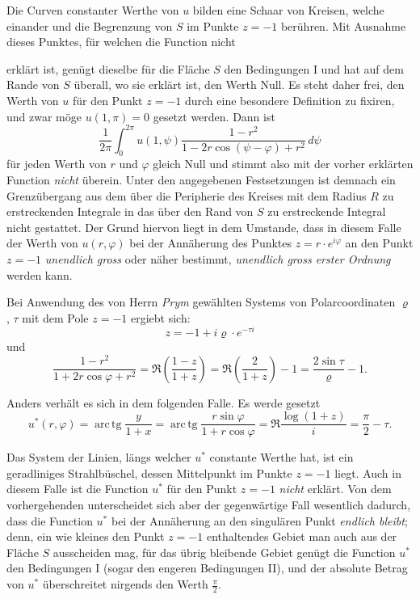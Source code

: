 \documentclass{article}
\begin{document}
Die Curven constanter Werthe von $u$ bilden eine Schaar von Kreisen, welche einander und die Begrenzung von $S$ im Punkte $z = -1$ berühren. Mit Ausnahme dieses Punktes, für welchen die Function nicht

erklärt ist, genügt dieselbe für die Fläche $S$ den Bedingungen I und hat auf dem Rande von $S$ überall, wo sie erklärt ist, den Werth Null. Es steht daher frei, den Werth von $u$ für den Punkt $z = -1$ durch eine besondere Definition zu fixiren, und zwar möge $u(1, \pi) = 0$ gesetzt werden. Dann ist
\[
\frac{1}{2\pi} \int_0^{2\pi} u(1, \psi) \frac{1 - r^2}{1 - 2r \cos(\psi - \varphi) + r^2}\,d\psi
\]
für jeden Werth von $r$ und $\varphi$ gleich Null und stimmt also mit der vorher erklärten Function \emph{nicht} überein. Unter den angegebenen Festsetzungen ist demnach ein Grenzübergang aus dem über die Peripherie des Kreises mit dem Radius $R$ zu erstreckenden Integrale in das über den Rand von $S$ zu erstreckende Integral nicht gestattet. Der Grund hiervon liegt in dem Umstande, dass in diesem Falle der Werth von $u(r, \varphi)$ bei der Annäherung des Punktes $z = r \cdot e^{i\varphi}$ an den Punkt $z = -1$ \emph{unendlich gross} oder näher bestimmt, \emph{unendlich gross erster Ordnung} werden kann.

Bei Anwendung des von Herrn \emph{Prym} gewählten Systems von Polarcoordinaten $\varrho$, $\tau$ mit dem Pole $z = -1$ ergiebt sich:
\[
z = -1 + i\varrho \cdot e^{-\tau i}
\]
und
\[
\frac{1 - r^2}{1 + 2r \cos\varphi + r^2} = \Re\left(\frac{1 - z}{1 + z}\right) = \Re\left(\frac{2}{1 + z}\right) - 1 = \frac{2\sin\tau}{\varrho} - 1.
\]

Anders verhält es sich in dem folgenden Falle. Es werde gesetzt
\[
u^*(r, \varphi) = \operatorname{arc\,tg}\frac{y}{1 + x} = \operatorname{arc\,tg}\frac{r\sin\varphi}{1 + r\cos\varphi} = \Re\frac{\log(1 + z)}{i} = \frac{\pi}{2} - \tau.
\]

Das System der Linien, längs welcher $u^*$ constante Werthe hat, ist ein geradliniges Strahlbüschel, dessen Mittelpunkt im Punkte $z = -1$ liegt. Auch in diesem Falle ist die Function $u^*$ für den Punkt $z = -1$ \emph{nicht} erklärt. Von dem vorhergehenden unterscheidet sich aber der gegenwärtige Fall wesentlich dadurch, dass die Function $u^*$ bei der Annäherung an den singulären Punkt \emph{endlich bleibt}; denn, ein wie kleines den Punkt $z = -1$ enthaltendes Gebiet man auch aus der Fläche $S$ ausscheiden mag, für das übrig bleibende Gebiet genügt die Function $u^*$ den Bedingungen I (sogar den engeren Bedingungen II), und der absolute Betrag von $u^*$ überschreitet nirgends den Werth $\frac{\pi}{2}$.
\end{document}
